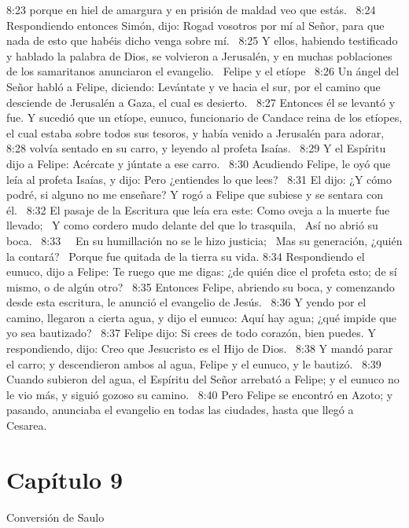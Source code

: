 8:23 porque en hiel de amargura y en prisión de maldad veo que estás.  
8:24 Respondiendo entonces Simón, dijo: Rogad vosotros por mí al Señor, para que nada de esto que habéis dicho venga sobre mí.  
8:25 Y ellos, habiendo testificado y hablado la palabra de Dios, se volvieron a Jerusalén, y en muchas poblaciones de los samaritanos anunciaron el evangelio.  
Felipe y el etíope  
8:26 Un ángel del Señor habló a Felipe, diciendo: Levántate y ve hacia el sur, por el camino que desciende de Jerusalén a Gaza, el cual es desierto.  
8:27 Entonces él se levantó y fue. Y sucedió que un etíope, eunuco, funcionario de Candace reina de los etíopes, el cual estaba sobre todos sus tesoros, y había venido a Jerusalén para adorar,  
8:28 volvía sentado en su carro, y leyendo al profeta Isaías.  
8:29 Y el Espíritu dijo a Felipe: Acércate y júntate a ese carro.  
8:30 Acudiendo Felipe, le oyó que leía al profeta Isaías, y dijo: Pero ¿entiendes lo que lees?  
8:31 El dijo: ¿Y cómo podré, si alguno no me enseñare? Y rogó a Felipe que subiese y se sentara con él.  
8:32 El pasaje de la Escritura que leía era este: 
Como oveja a la muerte fue llevado;  
Y como cordero mudo delante del que lo trasquila,  
Así no abrió su boca.  
8:33   En su humillación no se le hizo justicia;  
Mas su generación, ¿quién la contará?  
Porque fue quitada de la tierra su vida. 
8:34 Respondiendo el eunuco, dijo a Felipe: Te ruego que me digas: ¿de quién dice el profeta esto; de sí mismo, o de algún otro?  
8:35 Entonces Felipe, abriendo su boca, y comenzando desde esta escritura, le anunció el evangelio de Jesús.  
8:36 Y yendo por el camino, llegaron a cierta agua, y dijo el eunuco: Aquí hay agua; ¿qué impide que yo sea bautizado?  
8:37 Felipe dijo: Si crees de todo corazón, bien puedes. Y respondiendo, dijo: Creo que Jesucristo es el Hijo de Dios.  
8:38 Y mandó parar el carro; y descendieron ambos al agua, Felipe y el eunuco, y le bautizó.  
8:39 Cuando subieron del agua, el Espíritu del Señor arrebató a Felipe; y el eunuco no le vio más, y siguió gozoso su camino.  
8:40 Pero Felipe se encontró en Azoto; y pasando, anunciaba el evangelio en todas las ciudades, hasta que llegó a Cesarea.  
\section*{Capítulo 9}
Conversión de Saulo   

